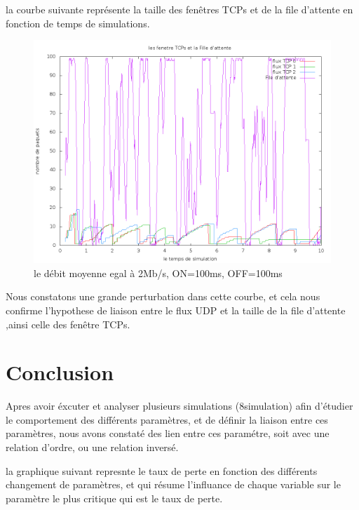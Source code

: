 \documentclass[a4paper]{report}
\theoremstyle{definition}
\begin{document}
la courbe suivante représente la taille des fenêtres TCPs et de la file d'attente en fonction de temps de simulations.  

\begin{figure}[h]
	\centering
		\includegraphics[width=450px]{graphic/rate2on100off100.png}
		\caption{le débit moyenne egal à 2Mb/s, ON=100ms, OFF=100ms}
\end{figure}

	Nous constatons une grande perturbation dans cette courbe, et cela nous confirme l'hypothese de liaison entre le flux UDP et la taille de la file d'attente ,ainsi celle des fenêtre TCPs.

\newpage


\section*{Conclusion} 
 Apres avoir éxcuter et analyser plusieurs simulations (8simulation) afin d'étudier le comportement des différents paramètres, et de définir la liaison entre ces paramètres, nous avons constaté des lien entre ces paramétre, soit avec une relation d'ordre, ou une relation inversé.
 
 	la graphique suivant represnte le taux de perte en fonction des différents changement de paramètres, et qui résume l'influance de chaque variable sur le paramètre le plus critique qui est le taux de perte.   
\end{document}
